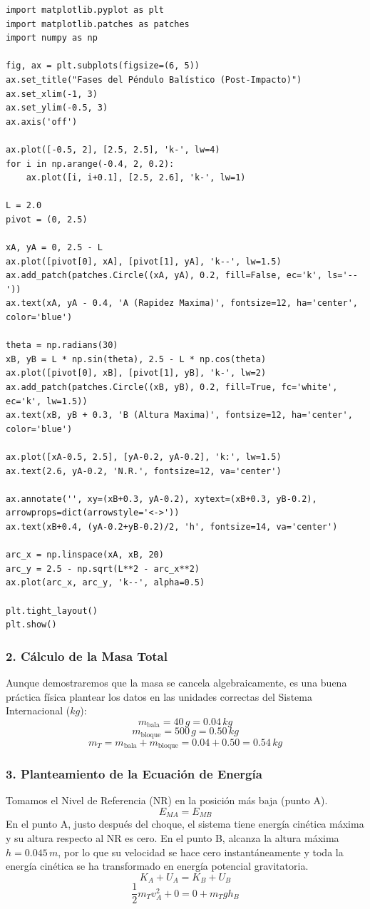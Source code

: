 \documentclass[12pt, a4paper]{article}
\begin{document}
\begin{lstlisting}
import matplotlib.pyplot as plt
import matplotlib.patches as patches
import numpy as np

fig, ax = plt.subplots(figsize=(6, 5))
ax.set_title("Fases del Péndulo Balístico (Post-Impacto)")
ax.set_xlim(-1, 3)
ax.set_ylim(-0.5, 3)
ax.axis('off')

ax.plot([-0.5, 2], [2.5, 2.5], 'k-', lw=4)
for i in np.arange(-0.4, 2, 0.2):
    ax.plot([i, i+0.1], [2.5, 2.6], 'k-', lw=1)

L = 2.0
pivot = (0, 2.5)

xA, yA = 0, 2.5 - L
ax.plot([pivot[0], xA], [pivot[1], yA], 'k--', lw=1.5)
ax.add_patch(patches.Circle((xA, yA), 0.2, fill=False, ec='k', ls='--'))
ax.text(xA, yA - 0.4, 'A (Rapidez Maxima)', fontsize=12, ha='center', color='blue')

theta = np.radians(30)
xB, yB = L * np.sin(theta), 2.5 - L * np.cos(theta)
ax.plot([pivot[0], xB], [pivot[1], yB], 'k-', lw=2)
ax.add_patch(patches.Circle((xB, yB), 0.2, fill=True, fc='white', ec='k', lw=1.5))
ax.text(xB, yB + 0.3, 'B (Altura Maxima)', fontsize=12, ha='center', color='blue')

ax.plot([xA-0.5, 2.5], [yA-0.2, yA-0.2], 'k:', lw=1.5)
ax.text(2.6, yA-0.2, 'N.R.', fontsize=12, va='center')

ax.annotate('', xy=(xB+0.3, yA-0.2), xytext=(xB+0.3, yB-0.2), arrowprops=dict(arrowstyle='<->'))
ax.text(xB+0.4, (yA-0.2+yB-0.2)/2, 'h', fontsize=14, va='center')

arc_x = np.linspace(xA, xB, 20)
arc_y = 2.5 - np.sqrt(L**2 - arc_x**2)
ax.plot(arc_x, arc_y, 'k--', alpha=0.5)

plt.tight_layout()
plt.show()
\end{lstlisting}

\subsubsection*{2. Cálculo de la Masa Total}
Aunque demostraremos que la masa se cancela algebraicamente, es una buena práctica física plantear los datos en las unidades correctas del Sistema Internacional ($\si{kg}$):
$$ m_{\text{bala}} = 40 \, \si{g} = 0.04 \, \si{kg} $$
$$ m_{\text{bloque}} = 500 \, \si{g} = 0.50 \, \si{kg} $$
$$ m_T = m_{\text{bala}} + m_{\text{bloque}} = 0.04 + 0.50 = 0.54 \, \si{kg} $$

\subsubsection*{3. Planteamiento de la Ecuación de Energía}
Tomamos el Nivel de Referencia (NR) en la posición más baja (punto A). 
$$ E_{MA} = E_{MB} $$
En el punto A, justo después del choque, el sistema tiene energía cinética máxima y su altura respecto al NR es cero. En el punto B, alcanza la altura máxima $h = 0.045 \, \si{m}$, por lo que su velocidad se hace cero instantáneamente y toda la energía cinética se ha transformado en energía potencial gravitatoria.
$$ K_A + U_A = K_B + U_B $$
$$ \frac{1}{2} m_T v_A^2 + 0 = 0 + m_T g h_B $$
\end{document}
